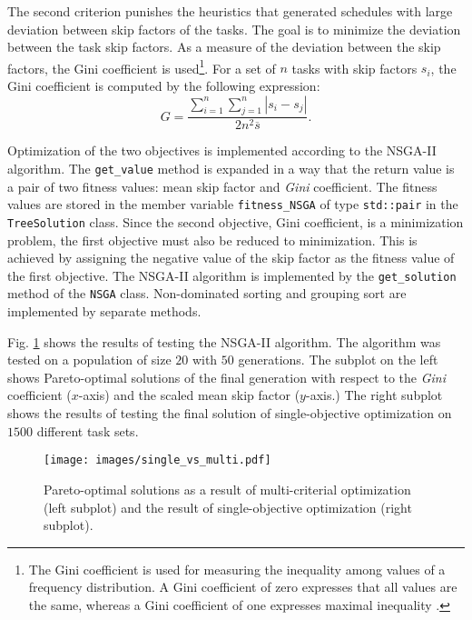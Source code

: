 The second criterion punishes the heuristics that generated schedules with large deviation between skip factors of the tasks.
The goal is to minimize the deviation between the task skip factors.
As a measure of the deviation between the skip factors, the Gini coefficient is used\footnote{The Gini coefficient is used for measuring the inequality among values of a frequency distribution. A Gini coefficient of zero expresses that all values are the same, whereas a Gini coefficient of one expresses maximal inequality \cite{gini1912variabilita}.}.
For a set of $n$ tasks with skip factors $s_i$, the Gini coefficient is computed by the following expression:
\begin{equation*}
G = \frac{\sum_{i=1}^{n}\sum_{j=1}^{n}|s_i - s_j|}{2n^2\overline{s}}.
\end{equation*}

Optimization of the two objectives is implemented according to the NSGA-II algorithm.
The \texttt{get\_value} method is expanded in a way that the return value is a pair of two fitness values: mean skip factor and \textit{Gini} coefficient.
The fitness values are stored in the member variable \texttt{fitness\_NSGA} of type \texttt{std::pair} in the \texttt{TreeSolution} class.
Since the second objective, Gini coefficient, is a minimization problem, the first objective must also be reduced to minimization.
This is achieved by assigning the negative value of the skip factor as the fitness value of the first objective.
The NSGA-II algorithm is implemented by the \texttt{get\_solution} method of the \texttt{NSGA} class.
Non-dominated sorting and grouping sort are implemented by separate methods.

Fig. \ref{single_vs_multi} shows the results of testing the NSGA-II algorithm.
The algorithm was tested on a population of size $20$ with $50$ generations.
The subplot on the left shows Pareto-optimal solutions of the final generation with respect to the \textit{Gini} coefficient ($x$-axis) and the scaled mean skip factor ($y$-axis.)
The right subplot shows the results of testing the final solution of single-objective optimization on $1500$ different task sets.
\begin{figure}[ht]
    \centering
    \texttt{[image: images/single\_vs\_multi.pdf]}
    \caption{Pareto-optimal solutions as a result of multi-criterial optimization (left subplot) and the result of single-objective optimization (right subplot). }
    \label{single_vs_multi}
\end{figure}

